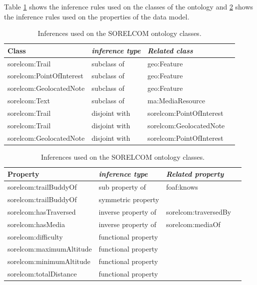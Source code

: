 Table \ref{tab:inferencecls} shows the inference rules used on the classes of the ontology and \ref{tab:inferenceprop} shows the inference rules used on the properties of the data model.

\begin{table}[ht]
  \centering
  \caption{Inferences used on the SORELCOM ontology classes.}\label{tab:inferencecls}
  \begin{tabular}{llll}
    \toprule
      \textbf{Class} & \emph{inference type}  & \emph{Related class}\\
    \midrule
      sorelcom:Trail & subclass of & geo:Feature \\
      sorelcom:PointOfInterest & subclass of & geo:Feature \\
      sorelcom:GeolocatedNote & subclass of & geo:Feature \\
      sorelcom:Text & subclass of & ma:MediaResource \\
      sorelcom:Trail & disjoint with & sorelcom:PointOfInterest \\
      sorelcom:Trail & disjoint with & sorelcom:GeolocatedNote \\
      sorelcom:GeolocatedNote & disjoint with & sorelcom:PointOfInterest \\
    \bottomrule
  \end{tabular}
\end{table}

\begin{table}[ht]
  \centering
  \caption{Inferences used on the SORELCOM ontology classes.}\label{tab:inferenceprop}
  \begin{tabular}{llll}
    \toprule
      \textbf{Property} & \emph{inference type}  & \emph{Related property}\\
    \midrule
      sorelcom:trailBuddyOf & sub property of & foaf:knows \\
      sorelcom:trailBuddyOf & symmetric property \\
      sorelcom:hasTraversed & inverse property of & sorelcom:traversedBy \\
      sorelcom:hasMedia & inverse property of & sorelcom:mediaOf \\
      sorelcom:difficulty & functional property \\
      sorelcom:maximumAltitude & functional property \\
      sorelcom:minimumAltitude & functional property \\
      sorelcom:totalDistance & functional property \\
    \bottomrule
  \end{tabular}
\end{table}

